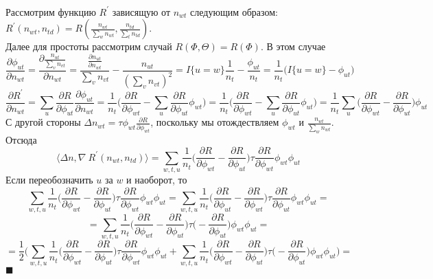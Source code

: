 \documentclass[12pt]{article}
\newenvironment{Proof} 
	{\par\noindent{\bf Доказательство.}} 
	{\hfill$\blacksquare$}
\begin{document}
\begin{Proof}\\
Рассмотрим функцию $R^{\prime}$ зависящую от $n_{wt}$ следующим образом: $R^{\prime}(n_{wt}, n_{td}) = R( \frac{n_{wt}}{\sum\limits_w n_{wt}},  \frac{n_{td}}{\sum\limits_t n_{td}})$. \\
Далее для простоты рассмотрим случай $R(\Phi, \Theta) = R(\Phi)$. В этом случае 
\[
\frac{\partial{\phi_{ut}}}{\partial{n_{wt}}} = \frac{\partial{ \frac{n_{ut}}{\sum\limits_v n_{vt}}}}{\partial{n_{wt}}} = \frac{ \frac{\partial{n_{ut}}}{\partial{n_{wt}}}}{\sum\limits_v n_{vt}} - \frac{n_{ut}}{(\sum\limits_v n_{vt})^2} = I\{u = w\} \frac{1}{n_t} - \frac{\phi_{ut}}{n_t} = \frac{1}{n_t}\bigg( 
 I\{u = w\} - \phi_{ut} \bigg)
\]
\[
\frac{\partial{R^{\prime}}}{\partial{n_{wt}}} = \sum_{u} \frac{\partial{R}}{\partial{\phi_{ut}}} \frac{\partial{\phi_{ut}}}{\partial{n_{wt}}} = \frac{1}{n_t} \bigg( \frac{\partial{R}}{\partial{\phi_{wt}}} - \sum_{u}  \frac{\partial{R}}{\partial{\phi_{ut}}} \phi_{wt} \bigg) = \frac{1}{n_t} \bigg( \frac{\partial{R}}{\partial{\phi_{wt}}} - \sum_{u}  \frac{\partial{R}}{\partial{\phi_{ut}}} \phi_{ut} \bigg) = \frac{1}{n_t} \sum_{u} \bigg(\frac{\partial{R}}{\partial{\phi_{wt}}}  -  \frac{\partial{R}}{\partial{\phi_{ut}}} \bigg)  \phi_{ut}
\]
С другой стороны $\Delta n_{wt} = \tau \phi_{wt} \frac{\partial{R}}{\partial{\phi_{wt}}}$, поскольку мы отождествляем $\phi_{wt}$ и $\frac{n_{wt}}{\sum\limits_w n_{wt}}$. Отсюда
\[
\langle \Delta n, \nabla\ R^{\prime}(n_{wt}, n_{td})\rangle = \sum\limits_{w, t, u}  \frac{1}{n_{t}}  \bigg(  \frac{\partial{R}}{\partial{\phi_{wt}}}  -  \frac{\partial{R}}{\partial{\phi_{ut}}}  \bigg)  \tau \frac{\partial{R}}{\partial{\phi_{wt}}} \phi_{wt} \phi_{ut}
\]
Если переобозначить $u$ за $w$ и наоборот, то 
\[
\sum\limits_{w, t, u}  \frac{1}{n_{t}}  \bigg(  \frac{\partial{R}}{\partial{\phi_{wt}}}  -  \frac{\partial{R}}{\partial{\phi_{ut}}}  \bigg)  \tau \frac{\partial{R}}{\partial{\phi_{wt}}} \phi_{wt} \phi_{ut}  = \sum\limits_{w, t, u}  \frac{1}{n_{t}}  \bigg(  \frac{\partial{R}}{\partial{\phi_{ut}}}  -  \frac{\partial{R}}{\partial{\phi_{wt}}}  \bigg)  \tau \frac{\partial{R}}{\partial{\phi_{ut}}} \phi_{wt} \phi_{ut} = 
\]
\[
= \sum\limits_{w, t, u}  \frac{1}{n_{t}}  \bigg(  \frac{\partial{R}}{\partial{\phi_{wt}}}  -  \frac{\partial{R}}{\partial{\phi_{ut}}}  \bigg)  \tau \big(-\frac{\partial{R}}{\partial{\phi_{ut}}}\big) \phi_{wt} \phi_{ut} = 
\]
\[
= \frac12 \bigg(\sum\limits_{w, t, u}  \frac{1}{n_{t}}  \bigg(  \frac{\partial{R}}{\partial{\phi_{wt}}}  -  \frac{\partial{R}}{\partial{\phi_{ut}}}  \bigg)  \tau \frac{\partial{R}}{\partial{\phi_{wt}}} \phi_{wt} \phi_{ut} +  \sum\limits_{w, t, u}  \frac{1}{n_{t}}  \bigg(  \frac{\partial{R}}{\partial{\phi_{wt}}}  -  \frac{\partial{R}}{\partial{\phi_{ut}}}  \bigg)  \tau \big(-\frac{\partial{R}}{\partial{\phi_{ut}}}\big) \phi_{wt} \phi_{ut} \bigg)= 
\]
\end{Proof}
\end{document}
